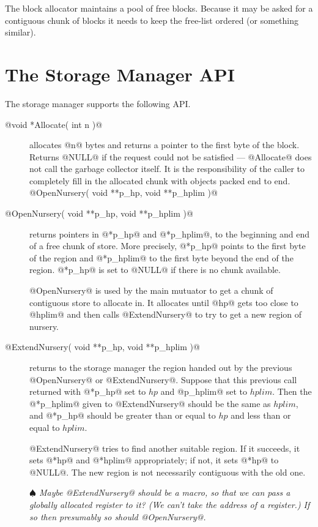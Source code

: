 \documentclass{article}
\newcommand{\block}{block}
\newcommand{\note}[1]{{\em $\spadesuit$ #1}}
\begin{document}
The \block{} allocator maintains a pool of free \block{}s.
Because it may be asked for a contiguous chunk of \block{}s it 
needs to keep the free-list ordered (or something similar).


\section{The Storage Manager API}

The storage manager supports the following API.
\begin{description}
\item[@void *Allocate( int n )@] allocates @n@ bytes and returns
a pointer to the first byte of the block.  Returns @NULL@ if
the request could not be satisfied --- @Allocate@ does not call
the garbage collector itself.  It is the responsibility of the caller
to completely fill in the allocated chunk with objects packed end to
end. @OpenNursery( void **p_hp, void **p_hplim )@ 

\item[@OpenNursery( void **p\_hp, void **p\_hplim )@]
returns pointers in @*p_hp@ and @*p_hplim@, to the beginning and end
of a free chunk of store.  
More precisely, @*p_hp@ points to the first byte of the region
and @*p_hplim@ to the first byte beyond the end of the region.
@*p_hp@ is set to @NULL@ if there is no chunk available.

@OpenNursery@ is used by the main mutuator to get a chunk of
contiguous store to allocate in.  It allocates until @hp@ gets
too close to @hplim@ and then calls @ExtendNursery@ to try
to get a new region of nursery.

\item[@ExtendNursery( void **p\_hp, void **p\_hplim )@]
returns to the storage manager the region handed out by
the previous @OpenNursery@ or @ExtendNursery@.  Suppose that 
this previous call returned with @*p_hp@ set 
to $hp$ and @p_hplim@ set to
$hplim$.
Then the @*p_hplim@ given to @ExtendNursery@ should be the same 
as $hplim$, and @*p_hp@ should be greater than or equal to $hp$ and 
less than or equal to $hplim$.  

@ExtendNursery@ tries to find another suitable region.  If it 
succeeds, it sets @*hp@ and @*hplim@ appropriately; if not, it sets
@*hp@ to @NULL@.  The new region is not necessarily contiguous 
with the old one.

\note{Maybe @ExtendNursery@ should be a macro, so that we can pass a
globally allocated register to it?  (We can't take the address of a register.)
If so then presumably so should @OpenNursery@.}


\end{description}
\end{document}
